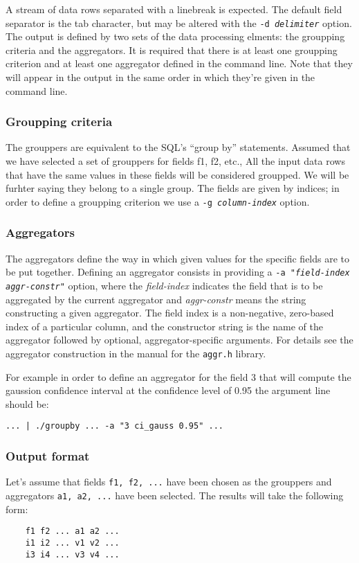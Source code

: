 \documentclass{report}
\begin{document}
	A stream of data rows separated with a linebreak is expected. The default
	field separator is the tab character, but may be altered with the
	\texttt{-d \textit{delimiter}} option. The output is defined by two sets
	of the data processing elments: the groupping criteria and the aggregators.
	It is required that there is at least one groupping criterion and at least one
	aggregator defined in the command line. Note that they will appear in the output
	in the same order in which they're given in the command line.

	\subsubsection{Groupping criteria}
	The grouppers are equivalent to the SQL's ``group by'' statements.
	Assumed that we have selected a set of grouppers for fields f1, f2, etc.,
	All the input data rows that have the same values in these fields will be
	considered groupped. We will be furhter saying they belong to a single group.
	The fields are given by indices; in order to define a groupping criterion we use
	a \texttt{-g \textit{column-index}} option.

	\subsubsection{Aggregators}
	The aggregators define the way in which given values for the specific fields
	are to be put together. Defining an aggregator consists in providing a
	\texttt{-a "\textit{field-index} \textit{aggr-constr}"} option, where the
	\textit{field-index} indicates the field that is to be aggregated by the
	current aggregator and \textit{aggr-constr} means the string constructing
	a given aggregator. The field index is a non-negative, zero-based index
	of a particular column, and the constructor string is the name of the
	aggregator followed by optional, aggregator-specific arguments. For details see
	the aggregator construction in the manual for the \texttt{aggr.h} library.

	For example in order to define an aggregator for the field 3 that will compute
	the gaussion confidence interval at the confidence level of 0.95 the argument
	line should be:

	\texttt{... | ./groupby ... -a "3 ci\_gauss 0.95" ...}

	\subsubsection{Output format}
	Let's assume that fields \texttt{f1, f2, ...} have been chosen as the
	grouppers and aggregators \texttt{a1, a2, ...} have been selected.
	The results will take the following form:
	\begin{verbatim}
	f1 f2 ... a1 a2 ...
	i1 i2 ... v1 v2 ...
	i3 i4 ... v3 v4 ...
	\end{verbatim}
\end{document}
